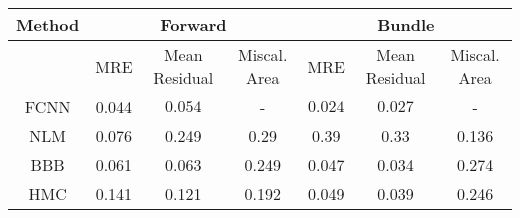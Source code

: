 \documentclass[convert={outext=.png}]{standalone}
\begin{document}
\centering
\label{tab:experimental_results}



\begin{tabular}{c c c c c c c}
\hline
\hline
Method &  \multicolumn{3}{c}{Forward} & \multicolumn{3}{c}{Bundle} \\ \hline
 & MRE & Mean Residual & Miscal. Area & MRE & Mean Residual & Miscal. Area\\
 FCNN & 0.044 & $\mathbf{0.054}$ & - & $\mathbf{0.024}$ & $\mathbf{0.027}$ & - \\
 \hline
 NLM & 0.076 & 0.249 & 0.29 & 0.39 & 0.33 & 0.136 \\
 BBB & 0.061 & 0.063 & 0.249 & 0.047 & 0.034 & 0.274 \\
 HMC & 0.141 & 0.121 & 0.192 & 0.049 & 0.039 & 0.246 \\
\hline
\hline
\end{tabular}
\end{document}
